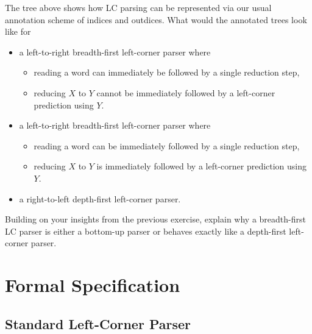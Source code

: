\begin{exercise}
    The tree above shows how LC parsing can be represented via our usual annotation scheme of indices and outdices.
    What would the annotated trees look like for
    \begin{itemize}
        \item a left-to-right breadth-first left-corner parser where
            \begin{itemize}
                \item reading a word can immediately be followed by a single reduction step,
                \item reducing $X$ to $Y$ cannot be immediately followed by a left-corner prediction using $Y$.
            \end{itemize}
        \item a left-to-right breadth-first left-corner parser where
            \begin{itemize}
                \item reading a word can be immediately followed by a single reduction step,
                \item reducing $X$ to $Y$ is immediately followed by a left-corner prediction using $Y$.
            \end{itemize}
        \item a right-to-left depth-first left-corner parser.
    \end{itemize}
\end{exercise}

\begin{exercise}
    Building on your insights from the previous exercise, explain why a breadth-first LC parser is either a bottom-up parser or behaves exactly like a depth-first left-corner parser.
\end{exercise}

\section{Formal Specification}
\label{sec:LeftCorner_Formal}

\subsection{Standard Left-Corner Parser}
\label{sub:LeftCorner_Standard}

